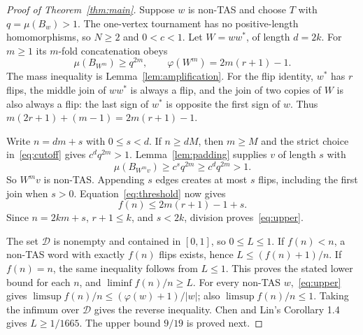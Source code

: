 \documentclass[11pt]{article}
\newcommand{\ph}{\varphi}
\begin{document}
\begin{proof}[Proof of Theorem~\ref{thm:main}]
Suppose $w$ is non-TAS and choose $T$ with $q=\mu(B_w)>1$.
The one-vertex tournament has no positive-length homomorphisms, so $N\geq2$
and $0<c<1$. Let $W=ww^*$, of length $d=2k$.
For $m\geq1$ its $m$-fold concatenation obeys
\begin{equation}\label{eq:repeated}
 \mu(B_{W^m})\geq q^{2m},\qquad
 \ph(W^m)=2m(r+1)-1.
\end{equation}
The mass inequality is Lemma~\ref{lem:amplification}.
For the flip identity, $w^*$ has $r$ flips, the middle join of $ww^*$ is
always a flip, and the join of two copies of $W$ is also always a flip:
the last sign of $w^*$ is opposite the first sign of $w$.
Thus $m(2r+1)+(m-1)=2m(r+1)-1$.

Write $n=dm+s$ with $0\leq s<d$. If $n\geq dM$, then $m\geq M$ and
the strict choice in~\eqref{eq:cutoff} gives $c^dq^{2m}>1$.
Lemma~\ref{lem:padding} supplies $v$ of length $s$ with
\[
 \mu(B_{W^mv})\geq c^sq^{2m}\geq c^dq^{2m}>1.
\]
So $W^mv$ is non-TAS. Appending $s$ edges creates at most $s$ flips,
including the first join when $s>0$. Equation~\eqref{eq:threshold} now gives
\[
 f(n)\leq2m(r+1)-1+s.
\]
Since $n=2km+s$, $r+1\leq k$, and $s<2k$, division proves~\eqref{eq:upper}.

The set $\mathcal D$ is nonempty and contained in $[0,1]$, so $0\leq L\leq1$.
If $f(n)<n$, a non-TAS word with exactly $f(n)$ flips exists, hence
$L\leq(f(n)+1)/n$. If $f(n)=n$, the same inequality follows from $L\leq1$.
This proves the stated lower bound for each $n$, and
$\liminf f(n)/n\geq L$.
For every non-TAS $w$,~\eqref{eq:upper} gives
$\limsup f(n)/n\leq(\ph(w)+1)/|w|$; also $\limsup f(n)/n\leq1$.
Taking the infimum over $\mathcal D$ gives the reverse inequality.
Chen and Lin's Corollary 1.4 gives $L\geq1/1665$.
The upper bound $9/19$ is proved next.
\end{proof}
\end{document}
